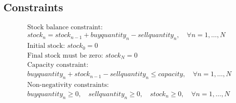 \documentclass{article}
\begin{document}
\subsection*{Constraints}
\begin{align}
    & \text{Stock balance constraint:} \\
    & stock_n = stock_{n-1} + buyquantity_n - sellquantity_n, \quad \forall n = 1, \ldots, N \\
    & \text{Initial stock: } stock_0 = 0 \\
    & \text{Final stock must be zero: } stock_N = 0 \\
    & \text{Capacity constraint:} \\
    & buyquantity_n + stock_{n-1} - sellquantity_n \leq capacity, \quad \forall n = 1, \ldots, N \\
    & \text{Non-negativity constraints:} \\
    & buyquantity_n \geq 0, \quad sellquantity_n \geq 0, \quad stock_n \geq 0, \quad \forall n = 1, \ldots, N
\end{align}
\end{document}
